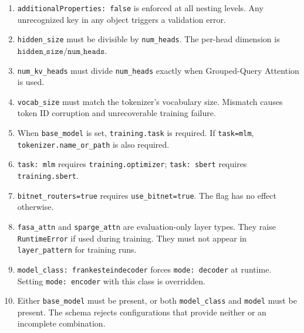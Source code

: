 \begin{enumerate}[nosep]
    \item \texttt{additionalProperties: false} is enforced at all nesting levels. Any unrecognized key in any object triggers a validation error.
    \item \texttt{hidden\_size} must be divisible by \texttt{num\_heads}. The per-head dimension is $\texttt{hidden\_size} / \texttt{num\_heads}$.
    \item \texttt{num\_kv\_heads} must divide \texttt{num\_heads} exactly when Grouped-Query Attention is used.
    \item \texttt{vocab\_size} must match the tokenizer's vocabulary size. Mismatch causes token ID corruption and unrecoverable training failure.
    \item When \texttt{base\_model} is set, \texttt{training.task} is required. If \texttt{task=mlm}, \texttt{tokenizer.name\_or\_path} is also required.
    \item \texttt{task: mlm} requires \texttt{training.optimizer}; \texttt{task: sbert} requires \texttt{training.sbert}.
    \item \texttt{bitnet\_routers=true} requires \texttt{use\_bitnet=true}. The flag has no effect otherwise.
    \item \texttt{fasa\_attn} and \texttt{sparge\_attn} are evaluation-only layer types. They raise \texttt{RuntimeError} if used during training. They must not appear in \texttt{layer\_pattern} for training runs.
    \item \texttt{model\_class: frankesteindecoder} forces \texttt{mode: decoder} at runtime. Setting \texttt{mode: encoder} with this class is overridden.
    \item Either \texttt{base\_model} must be present, or both \texttt{model\_class} and \texttt{model} must be present. The schema rejects configurations that provide neither or an incomplete combination.
\end{enumerate}
